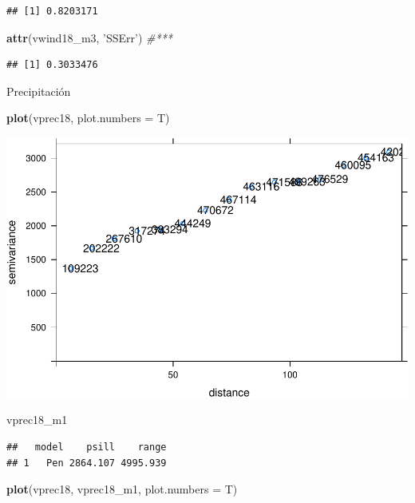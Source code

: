 \documentclass[11pt,]{article}
\newenvironment{Shaded}{\begin{snugshade}}{\end{snugshade}}
\newcommand{\KeywordTok}[1]{\textcolor[rgb]{0.13,0.29,0.53}{\textbf{#1}}}
\newcommand{\DataTypeTok}[1]{\textcolor[rgb]{0.13,0.29,0.53}{#1}}
\newcommand{\StringTok}[1]{\textcolor[rgb]{0.31,0.60,0.02}{#1}}
\newcommand{\CommentTok}[1]{\textcolor[rgb]{0.56,0.35,0.01}{\textit{#1}}}
\newcommand{\NormalTok}[1]{#1}
\begin{document}
\begin{verbatim}
## [1] 0.8203171
\end{verbatim}

\begin{Shaded}
\begin{Highlighting}[]
\KeywordTok{attr}\NormalTok{(vwind18_m3, }\StringTok{'SSErr'}\NormalTok{) }\CommentTok{#***}
\end{Highlighting}
\end{Shaded}

\begin{verbatim}
## [1] 0.3033476
\end{verbatim}

Precipitación

\begin{Shaded}
\begin{Highlighting}[]
\KeywordTok{plot}\NormalTok{(vprec18, }\DataTypeTok{plot.numbers =}\NormalTok{ T)}
\end{Highlighting}
\end{Shaded}

\includegraphics{proyecto_files/figure-latex/unnamed-chunk-44-1.pdf}

\begin{Shaded}
\begin{Highlighting}[]
\NormalTok{vprec18_m1}
\end{Highlighting}
\end{Shaded}

\begin{verbatim}
##   model    psill    range
## 1   Pen 2864.107 4995.939
\end{verbatim}

\begin{Shaded}
\begin{Highlighting}[]
\KeywordTok{plot}\NormalTok{(vprec18, vprec18_m1, }\DataTypeTok{plot.numbers =}\NormalTok{ T)}
\end{Highlighting}
\end{Shaded}
\end{document}
